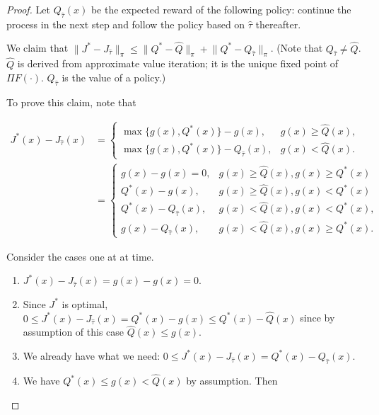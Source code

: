  \begin{proof}
 
 Let \(Q_{\hat{\tau}}(x)\) be the expected reward of the following policy: continue the process in the next step and follow the policy based on \(\hat{\tau}\) thereafter. 
 
 We claim that \(\lVert J^* - J_{\hat{\tau}} \rVert_\pi \leq \lVert Q^* - \hat{Q} \rVert_\pi +  \lVert Q^* -  Q_{\hat{\tau}} \rVert_\pi \). (Note that \(Q_{\hat{\tau}} \neq \hat{Q}\). \(\hat{Q}\) is derived from approximate value iteration; it is the unique fixed point of \(\Pi F(\cdot)\). \(Q_{\hat{\tau}}\) is the value of a policy.)
 
 To prove this claim, note that 
 
 \begin{align*}
 J^*(x) - J_{\hat{\tau}}(x)  & = \begin{cases}
 \max\{g(x), Q^*(x)\} - g(x) , & g(x) \geq \hat{Q}(x),
 \\   \max\{g(x), Q^*(x)\} - Q_{\hat{\tau}}(x) , & g(x) < \hat{Q}(x).
 \end{cases}
 \\ & = \begin{cases}
g(x) - g(x) = 0 , & g(x) \geq \hat{Q}(x), g(x) \geq Q^*(x)
 \\  Q^*(x) - g(x) , & g(x) \geq \hat{Q}(x), g(x) < Q^*(x)
  \\   Q^*(x) - Q_{\hat{\tau}}(x) , & g(x) < \hat{Q}(x), g(x) < Q^*(x),
   \\   g(x) - Q_{\hat{\tau}}(x) , & g(x) < \hat{Q}(x), g(x) \geq Q^*(x).
 \end{cases}
 \end{align*}
 
 Consider the cases one at at time.
 
 \begin{enumerate}
 
 \item \(J^*(x) - J_{\hat{\tau}}(x) = g(x) - g(x) = 0\).
 
 \item Since \(J^*\) is optimal, \(0 \leq J^*(x) - J_{\hat{\tau}}(x) = Q^*(x) - g(x) \leq Q^*(x) -  \hat{Q}(x)\) since by assumption of this case \(\hat{Q}(x) \leq g(x)\). 
 
 \item We already have what we need: \(0 \leq J^*(x) - J_{\hat{\tau}}(x) = Q^*(x) - Q_{\hat{\tau}}(x)\). 
 
 \item We have \(Q^*(x) \leq g(x) < \hat{Q}(x)\) by assumption. Then 
 

\end{enumerate}
\end{proof}
